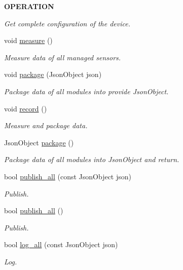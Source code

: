 \begin{Indent}{\bf O\+P\+E\+R\+A\+T\+I\+ON}
\begin{DoxyCompactItemize}
\begin{DoxyCompactList}\small\item\em Get complete configuration of the device. \end{DoxyCompactList}\item 
void \hyperlink{class_loom_manager_a3202f184c7d76abff38a353347c3f457}{measure} ()
\begin{DoxyCompactList}\small\item\em Measure data of all managed sensors. \end{DoxyCompactList}\item 
void \hyperlink{class_loom_manager_ad09d72a0950ee5df48371e4d49a56e68}{package} (Json\+Object json)
\begin{DoxyCompactList}\small\item\em Package data of all modules into provide Json\+Object. \end{DoxyCompactList}\item 
void \hyperlink{class_loom_manager_af62aaa2aea11411f65b3fe1ed2c4c3d7}{record} ()
\begin{DoxyCompactList}\small\item\em Measure and package data. \end{DoxyCompactList}\item 
Json\+Object \hyperlink{class_loom_manager_a34666ea29808834e120ef169f389387b}{package} ()
\begin{DoxyCompactList}\small\item\em Package data of all modules into Json\+Object and return. \end{DoxyCompactList}\item 
bool \hyperlink{class_loom_manager_a85bcc5929215f48af9dffed13bd78862}{publish\+\_\+all} (const Json\+Object json)
\begin{DoxyCompactList}\small\item\em Publish. \end{DoxyCompactList}\item 
bool \hyperlink{class_loom_manager_a5cea46f54dd9f891108bc0adf2c2d437}{publish\+\_\+all} ()
\begin{DoxyCompactList}\small\item\em Publish. \end{DoxyCompactList}\item 
bool \hyperlink{class_loom_manager_a349a86e686c0b71d8613f1e5a58ea2e3}{log\+\_\+all} (const Json\+Object json)
\begin{DoxyCompactList}\small\item\em Log. \end{DoxyCompactList}\item 

\end{DoxyCompactItemize}
\end{Indent}
